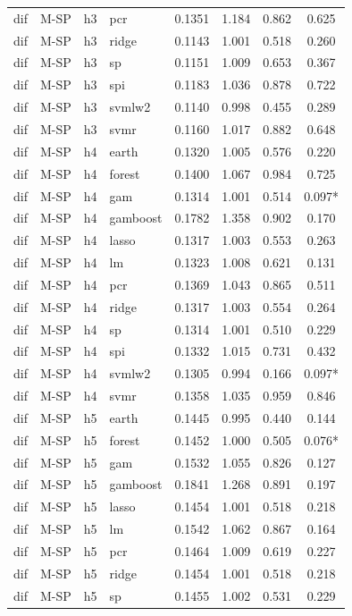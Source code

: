 \begin{ThreePartTable}
\begin{longtable}[t]{llclcccc}
dif & M-SP & h3 & pcr & 0.1351 & 1.184 & 0.862 & 0.625\\
dif & M-SP & h3 & ridge & 0.1143 & 1.001 & 0.518 & 0.260\\
dif & M-SP & h3 & sp & 0.1151 & 1.009 & 0.653 & 0.367\\
dif & M-SP & h3 & spi & 0.1183 & 1.036 & 0.878 & 0.722\\
dif & M-SP & h3 & svmlw2 & 0.1140 & 0.998 & 0.455 & 0.289\\
dif & M-SP & h3 & svmr & 0.1160 & 1.017 & 0.882 & 0.648\\
\addlinespace
dif & M-SP & h4 & earth & 0.1320 & 1.005 & 0.576 & 0.220\\
dif & M-SP & h4 & forest & 0.1400 & 1.067 & 0.984 & 0.725\\
dif & M-SP & h4 & gam & 0.1314 & 1.001 & 0.514 & 0.097*\\
dif & M-SP & h4 & gamboost & 0.1782 & 1.358 & 0.902 & 0.170\\
dif & M-SP & h4 & lasso & 0.1317 & 1.003 & 0.553 & 0.263\\
dif & M-SP & h4 & lm & 0.1323 & 1.008 & 0.621 & 0.131\\
dif & M-SP & h4 & pcr & 0.1369 & 1.043 & 0.865 & 0.511\\
dif & M-SP & h4 & ridge & 0.1317 & 1.003 & 0.554 & 0.264\\
dif & M-SP & h4 & sp & 0.1314 & 1.001 & 0.510 & 0.229\\
dif & M-SP & h4 & spi & 0.1332 & 1.015 & 0.731 & 0.432\\
dif & M-SP & h4 & svmlw2 & 0.1305 & 0.994 & 0.166 & 0.097*\\
dif & M-SP & h4 & svmr & 0.1358 & 1.035 & 0.959 & 0.846\\
\addlinespace
dif & M-SP & h5 & earth & 0.1445 & 0.995 & 0.440 & 0.144\\
dif & M-SP & h5 & forest & 0.1452 & 1.000 & 0.505 & 0.076*\\
dif & M-SP & h5 & gam & 0.1532 & 1.055 & 0.826 & 0.127\\
dif & M-SP & h5 & gamboost & 0.1841 & 1.268 & 0.891 & 0.197\\
dif & M-SP & h5 & lasso & 0.1454 & 1.001 & 0.518 & 0.218\\
dif & M-SP & h5 & lm & 0.1542 & 1.062 & 0.867 & 0.164\\
dif & M-SP & h5 & pcr & 0.1464 & 1.009 & 0.619 & 0.227\\
dif & M-SP & h5 & ridge & 0.1454 & 1.001 & 0.518 & 0.218\\
dif & M-SP & h5 & sp & 0.1455 & 1.002 & 0.531 & 0.229\\

\end{longtable}
\end{ThreePartTable}
